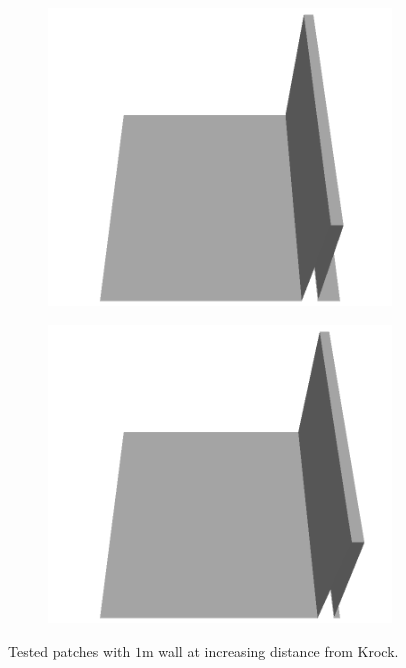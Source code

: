 \documentclass[../document.tex]{subfiles}
\begin{document}
\begin{figure}
\begin{subfigure}[b]{0.160\textwidth}
    \includegraphics[width=\linewidth]{../img/5/custom_patches/walls_front/all/15-3d.png}
    \end{subfigure}
    \begin{subfigure}[b]{0.160\textwidth}
    \includegraphics[width=\linewidth]{../img/5/custom_patches/walls_front/all/05-3d.png}
    \end{subfigure}
    \caption{Tested patches with $1$m wall at increasing distance from Krock.}
    \end{figure}
\end{document}
